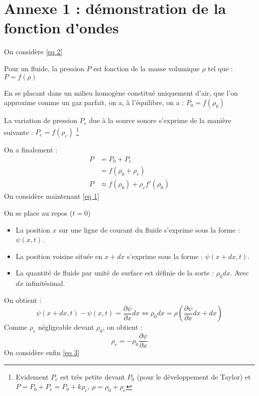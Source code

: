 \chapter*{Annexe 1 : démonstration de la fonction d'ondes}
\label{Annexe 1}
On considère \eqref{eq 2} \newline

Pour un fluide, la pression $P$ est fonction de la masse volumique $\rho$ tel que : $P = f(\rho)$ \newline

En se placant dans un milieu homogène constitué uniquement d'air, que l'on approxime comme un gaz parfait, on a, à l'équilibre, on a : $P_{0} = f(\rho_{0})$ \newline

La variation de pression $P_{e}$ due à la source sonore s'exprime de la manière suivante : $P_{e} =  f(\rho_{e})$ 
\footnote{Evidement $P_{e}$ est très petite devant $P_{0}$ (pour le développement de Taylor) et $P = P_{0} + P_{e} = P_{0} + k\rho_{e}$, $\rho = \rho_{0} + \rho_{e}$} \newline

On a finalement : 
\begin{align}
    P &= P_{0} +  P_{e} \nonumber \\
        &= f(\rho_{0} + \rho_{e}) \nonumber \\
    P   &\approx f(\rho_{0}) + \rho_{e}f'(\rho_{0}) \nonumber
\end{align}
On considère maintenant \eqref{eq 1} \newline

On se place au repos ($t=0$) \newline

\begin{itemize}
    \item La position $x$ sur une ligne de courant du fluide s'exprime sous la forme : $\psi (x,t)$. \newline
    \item La position voisine située en $x + dx$ s'exprime sous la forme : $\psi(x + dx,t)$. \newline
    \item La quantité de fluide par unité de surface est définie de la sorte : $\rho_{0}dx$. Avec $dx$ infinitésimal.
\end{itemize}
On obtient : 
\begin{equation}
    \psi(x + dx,t) - \psi(x,t) = \frac{\partial \psi}{\partial x}dx \Longleftrightarrow \rho_{0}dx = \rho(\frac{\partial \psi}{\partial x}dx + dx) \nonumber
\end{equation}
Comme $\rho_{e}$ négligeable devant $\rho_{0}$, on obtient : 
\begin{equation}
    \rho_{e} = - \rho_{0}\frac{\partial \psi}{\partial x} \nonumber
\end{equation}
\newpage
On considère enfin \eqref{eq 3} \newline

